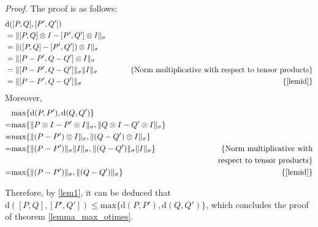 \textit {Proof.} The proof is as follows:
\begin{equation}
  \begin{split}
    & \text{d} ([P,Q],[P',Q'])  \\
    &=   \lVert  [P,Q] \otimes I - [P',Q'] \otimes I    \rVert_{\sigma} \hspace{2pt} \\
    &=   \lVert  ([P,Q]  - [P',Q']) \otimes I    \rVert_{\sigma} \hspace{2pt} \\
    &=   \lVert  [P-P',Q-Q'] \otimes I  \rVert_{\sigma}   \\
    &=    \lVert  [P-P',Q-Q'] \rVert_{\sigma} \lVert I \rVert_{\sigma}\hspace{2pt} & \hspace {20pt} \text{\{Norm multiplicative with respect to tensor products\}} \\ 
    &=    \lVert  [P-P',Q-Q'] \rVert_{\sigma} & \text{\{\autoref{lemid}\}}  \\
  \end{split}
  \end{equation}
Moreover,
\begin{equation}
  \begin{split}
     &  \text{max} \{\text{d} (P,P'),\text{d} (Q,Q')\} \\
     = &  \text{max}\{ \lVert P \otimes I - P' \otimes I \rVert_{\sigma}, \lVert Q \otimes I - Q'\otimes I \rVert_{\sigma} \}\\
     = &  \text{max}\{ \lVert (P - P') \otimes I \rVert_{\sigma}, \lVert (Q - Q') \otimes I \rVert_{\sigma} \}\\
     = &\text{max}\{ \lVert (P - P') \rVert_{\sigma} \lVert  I \rVert_{\sigma}, \lVert (Q - Q') \rVert_{\sigma} \lVert I \rVert_{\sigma} \} & \hspace{60pt} \text{\{Norm multiplicative with}\\
     && \text{respect to tensor products\}} \\
     = & \text{max}\{ \lVert (P - P') \rVert_{\sigma}, \lVert (Q - Q') \rVert_{\sigma}  \}  & \text{\{\autoref{lemid}\}}  \\
    \end{split}
  \end{equation}

Therefore, by \autoref{lem1}, it can be deduced that $\text{d} ([P,Q],[P',Q']) \leq \text{max} \{\text{d} (P,P'),\text{d} (Q,Q')\}$, which concludes the proof of theorem \autoref{lemma_max_otimes}.

\vspace{10pt}
  


